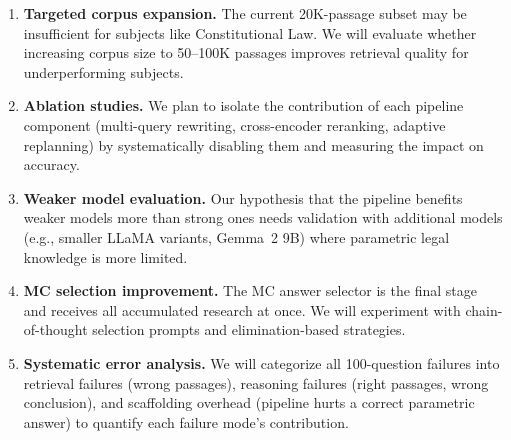 \documentclass{article}
\begin{document}
\begin{enumerate}[leftmargin=*,nosep]
    \item \textbf{Targeted corpus expansion.} The current 20K-passage subset may be insufficient for subjects like Constitutional Law. We will evaluate whether increasing corpus size to 50--100K passages improves retrieval quality for underperforming subjects.
    \item \textbf{Ablation studies.} We plan to isolate the contribution of each pipeline component (multi-query rewriting, cross-encoder reranking, adaptive replanning) by systematically disabling them and measuring the impact on accuracy.
    \item \textbf{Weaker model evaluation.} Our hypothesis that the pipeline benefits weaker models more than strong ones needs validation with additional models (e.g., smaller LLaMA variants, Gemma~2 9B) where parametric legal knowledge is more limited.
    \item \textbf{MC selection improvement.} The MC answer selector is the final stage and receives all accumulated research at once. We will experiment with chain-of-thought selection prompts and elimination-based strategies.
    \item \textbf{Systematic error analysis.} We will categorize all 100-question failures into retrieval failures (wrong passages), reasoning failures (right passages, wrong conclusion), and scaffolding overhead (pipeline hurts a correct parametric answer) to quantify each failure mode's contribution.
\end{enumerate}
\end{document}
